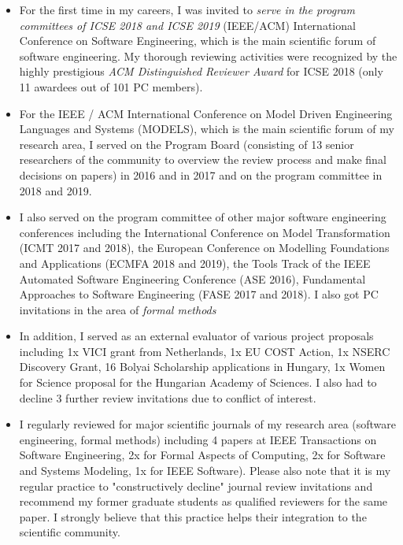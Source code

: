 \begin{itemize}
\item
For the first time in my careers, I was invited to \emph{serve in the program committees of ICSE 2018 and ICSE 2019} (IEEE/ACM) International Conference on Software Engineering, which is the main scientific forum of software engineering. My thorough reviewing activities were recognized by the highly prestigious \emph{ACM Distinguished Reviewer Award} for ICSE 2018 (only 11 awardees out of 101 PC members). 

\item
For the IEEE / ACM International Conference on Model Driven Engineering Languages and Systems (MODELS), which is the main scientific forum of my research area, I served on the Program Board (consisting of 13 senior researchers of the community to overview the review process and make final decisions on papers) in 2016 and in 2017 and on the program committee in 2018 and 2019. 

\item 
I also served on the program committee of other major software engineering conferences including the 
International Conference on Model Transformation (ICMT 2017 and 2018), the European Conference on Modelling Foundations and Applications (ECMFA 2018 and 2019), the Tools Track of the IEEE Automated Software Engineering Conference (ASE 2016), Fundamental Approaches to Software Engineering (FASE 2017 and 2018). I also got PC invitations in the area of \emph{formal methods}

\item 
In addition, I served as an external evaluator of various project proposals including 1x VICI grant from Netherlands, 1x EU COST Action, 1x NSERC Discovery Grant, 16 Bolyai Scholarship applications in Hungary, 1x Women for Science proposal for the Hungarian Academy of Sciences. I also had to decline 3 further review invitations due to conflict of interest.

\item
I regularly reviewed for major scientific journals of my research area (software engineering, formal methods) including 4 papers at IEEE Transactions on Software Engineering, 2x for Formal Aspects of Computing, 2x for Software and Systems Modeling, 1x for IEEE Software). Please also note that it is my regular practice to "constructively decline" journal review invitations and recommend my former graduate students as qualified reviewers for the same paper. I strongly believe that this practice helps their integration to the scientific community. 
\end{itemize}


